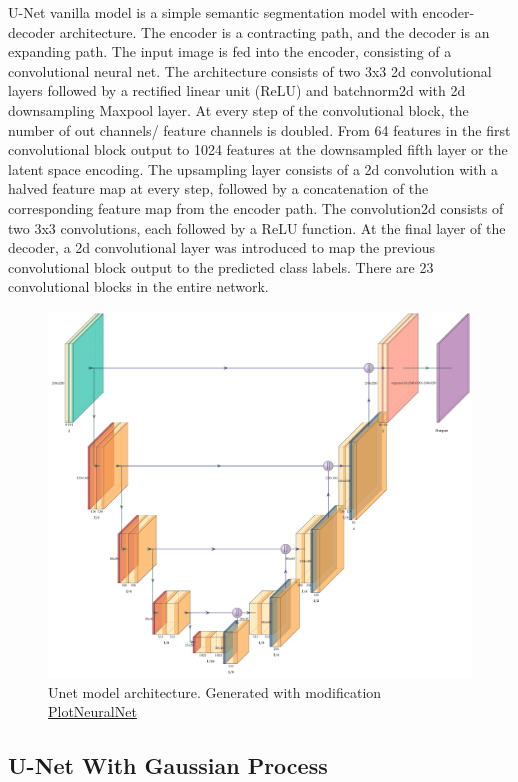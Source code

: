	U-Net vanilla model is a simple semantic segmentation model with encoder-decoder architecture. The encoder is a contracting path, and the decoder is an expanding path. The input image is fed into the encoder, consisting of a convolutional neural net. The architecture consists of two 3x3 2d convolutional layers followed by a rectified linear unit (ReLU) and batchnorm2d with 2d downsampling Maxpool layer. At every step of the convolutional block, the number of out channels/ feature channels is doubled. From 64 features in the first convolutional block output to 1024 features at the downsampled fifth layer or the latent space encoding. The upsampling layer consists of a 2d convolution with a halved feature map at every step, followed by a concatenation of the corresponding feature map from the encoder path. The convolution2d consists of two 3x3 convolutions, each followed by a ReLU function. At the final layer of the decoder, a 2d convolutional layer was introduced to map the previous convolutional block output to the predicted class labels. There are 23 convolutional blocks in the entire network.    
	
	\begin{figure}
		\centering
		\includegraphics[width=14cm]{images/Unet.jpg}
		\caption{Unet model architecture. Generated with modification \href{https://github.com/HarisIqbal88/PlotNeuralNet}{PlotNeuralNet}}
		\label{fig:unet_model}
	\end{figure}
	
    \subsection{U-Net With Gaussian Process}
    
